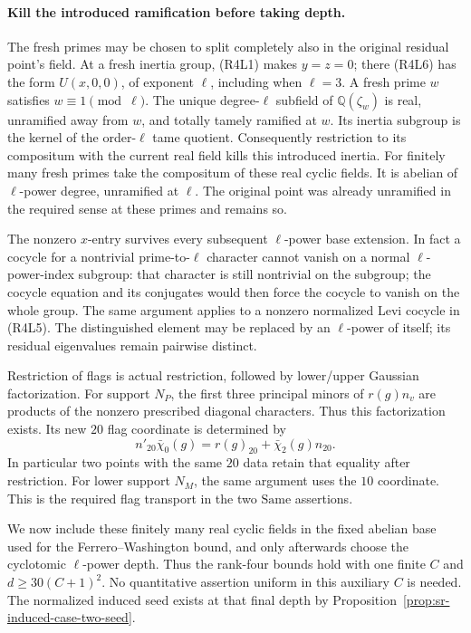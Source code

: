 \paragraph{Kill the introduced ramification before taking depth.}
The fresh primes may be chosen to split completely also in the
original residual point's field.
At a fresh inertia group, (R4L1) makes \(y=z=0\);
there (R4L6) has the form
\(U(x,0,0)\), of exponent \(\ell\), including when \(\ell=3\).
A fresh prime \(w\) satisfies \(w\equiv1\pmod\ell\).
The unique degree-\(\ell\) subfield of
\(\mathbb Q(\zeta_w)\) is real, unramified away from \(w\),
and totally tamely ramified at \(w\).
Its inertia subgroup is the kernel of the order-\(\ell\)
tame quotient. Consequently restriction to its compositum
with the current real field kills this introduced inertia.
For finitely many fresh primes take the compositum of these
real cyclic fields. It is abelian of \(\ell\)-power degree,
unramified at \(\ell\).
The original point was already unramified in the required
sense at these primes and remains so.

The nonzero \(x\)-entry survives every subsequent
\(\ell\)-power base extension.
In fact a cocycle for a nontrivial prime-to-\(\ell\)
character cannot vanish on a normal \(\ell\)-power-index
subgroup: that character is still nontrivial on the subgroup;
the cocycle equation and its conjugates would then force
the cocycle to vanish on the whole group.
The same argument applies to a nonzero normalized Levi
cocycle in (R4L5).
The distinguished element may be replaced by an
\(\ell\)-power of itself; its residual eigenvalues remain
pairwise distinct.

Restriction of flags is actual restriction, followed by
lower/upper Gaussian factorization.
For support \(N_P\), the first three principal minors of
\(r(g)n_v\) are products of the nonzero prescribed diagonal
characters. Thus this factorization exists.
Its new \(20\) flag coordinate is determined by
\[
       n'_{20}\bar\chi_0(g)
             =r(g)_{20}+\bar\chi_2(g)n_{20}.                \tag{R4L7}
\]
In particular two points with the same \(20\) data retain
that equality after restriction.
For lower support \(N_M\), the same argument uses the
\(10\) coordinate.
This is the required flag transport in the two
\(\mathrm{Same}\) assertions.

We now include these finitely many real cyclic fields in the
fixed abelian base used for the Ferrero--Washington bound,
and only afterwards choose the cyclotomic \(\ell\)-power
depth. Thus the rank-four bounds hold with one finite \(C\)
and \(d\ge30(C+1)^2\).
No quantitative assertion uniform in this auxiliary \(C\)
is needed.
The normalized induced seed exists at that final depth by
Proposition~\ref{prop:sr-induced-case-two-seed}.

